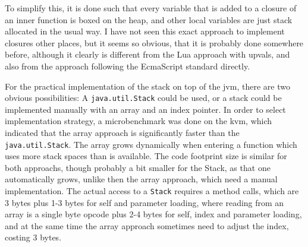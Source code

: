 \documentclass[11pt]{report}
\begin{document}
To simplify this, it is done such that every variable that is added to a closure of an inner function is boxed on the heap, and other local variables are just stack allocated in the usual way. 
I have not seen this exact approach to implement closures other places, but it seems so obvious, that it is probably done somewhere before, although it clearly is different from the Lua approach with upvals\cite{luasrc}, and also from the approach following the EcmaScript standard\cite{ecmascript} directly.

For the practical implementation of the stack on top of the jvm, there are two obvious possibilities: A \verb|java.util.Stack| could be used, or a stack could be implemented manually with an array and an index pointer. 
In order to select implementation strategy, a microbenchmark was done on the kvm, which indicated that the array approach is significantly faster than the \verb|java.util.Stack|. The array grows dynamically when entering a function which uses more stack spaces than is available. 
The code footprint size is similar for both approachs, though probably a bit smaller for the Stack, as that one automatically grows, unlike then the array approach, which need a manual implementation.
The actual access to a \verb|Stack| requires a method calls, which are 3 bytes plus 1-3 bytes for self and parameter loading, where reading from an array is a single byte opcode plus 2-4 bytes for self, index and parameter loading, and at the same time the array approach sometimes need to adjust the index, costing 3 bytes.
\end{document}
